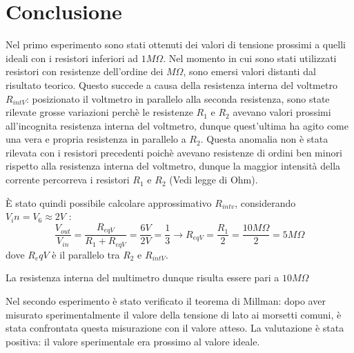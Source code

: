     \section{Conclusione}
    Nel primo esperimento sono stati ottenuti dei valori di tensione prossimi a quelli ideali con i resistori inferiori ad $1M\Omega$.
    Nel momento in cui sono stati utilizzati resistori con resistenze dell'ordine dei $M\Omega$, sono emersi valori distanti dal risultato teorico.
    Questo succede a causa della resistenza interna del voltmetro $R_{intV}$: posizionato il voltmetro in parallelo alla seconda resistenza, sono state rilevate grosse variazioni
    perchè le resistenze $R_1$ e $R_2$ avevano valori prossimi all'incognita resistenza interna del voltmetro, dunque quest'ultima ha agito come una vera e propria
    resistenza in parallelo a $R_2$. Questa anomalia non è stata rilevata con i resistori precedenti poichè avevano resistenze di ordini ben minori rispetto alla resistenza
    interna del voltmetro, dunque la maggior intensità della corrente percorreva i resistori $R_1$ e $R_2$ (Vedi legge di Ohm).\par
    È stato quindi possibile calcolare approssimativo $R_{intv}$, considerando $V_in = V_6 \approx 2V$ :
    \begin{equation}
        \frac{V_{out}}{V_{in}} = \frac{R_{eqV}}{R_1 + R_{eqV}} = \frac{6V}{2V} = \frac{1}{3} \longrightarrow R_{eqV} = \frac{R_1}{2} = \frac{10M\Omega}{2} = 5M\Omega
    \end{equation}
    dove $R_eqV$ è il parallelo tra $R_2$ e $R_{intV}$.\par
    La resistenza interna del multimetro dunque risulta essere pari a $10M\Omega$

    Nel secondo esperimento è stato verificato il teorema di Millman: dopo aver misurato sperimentalmente il valore della tensione di lato ai morsetti comuni,
    è stata confrontata questa misurazione con il valore atteso. La valutazione è stata positiva: il valore sperimentale era prossimo al valore ideale.

